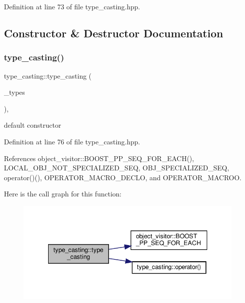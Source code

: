 Definition at line 73 of file type\+\_\+casting.\+hpp.



\subsection{Constructor \& Destructor Documentation}
\mbox{\label{structtype__casting_a7388d63d2d4363e4b48cbfa313f2be93}} 
\subsubsection{\texorpdfstring{type\+\_\+casting()}{type\_casting()}}
{\footnotesize\ttfamily type\+\_\+casting\+::type\+\_\+casting (\begin{DoxyParamCaption}\item[{\hyperlink{classCustomUnorderedSet}{Custom\+Unordered\+Set}$<$ unsigned int $>$ \&}]{\+\_\+types }\end{DoxyParamCaption})\hspace{0.3cm}{\ttfamily [inline]}, {\ttfamily [explicit]}}



default constructor 



Definition at line 76 of file type\+\_\+casting.\+hpp.



References object\+\_\+visitor\+::\+B\+O\+O\+S\+T\+\_\+\+P\+P\+\_\+\+S\+E\+Q\+\_\+\+F\+O\+R\+\_\+\+E\+A\+C\+H(), L\+O\+C\+A\+L\+\_\+\+O\+B\+J\+\_\+\+N\+O\+T\+\_\+\+S\+P\+E\+C\+I\+A\+L\+I\+Z\+E\+D\+\_\+\+S\+EQ, O\+B\+J\+\_\+\+S\+P\+E\+C\+I\+A\+L\+I\+Z\+E\+D\+\_\+\+S\+EQ, operator()(), O\+P\+E\+R\+A\+T\+O\+R\+\_\+\+M\+A\+C\+R\+O\+\_\+\+D\+E\+C\+LO, and O\+P\+E\+R\+A\+T\+O\+R\+\_\+\+M\+A\+C\+R\+OO.

Here is the call graph for this function\+:
\nopagebreak
\begin{figure}[H]
\begin{center}
\leavevmode
\includegraphics[width=335pt]{dd/d6d/structtype__casting_a7388d63d2d4363e4b48cbfa313f2be93_cgraph}
\end{center}
\end{figure}


